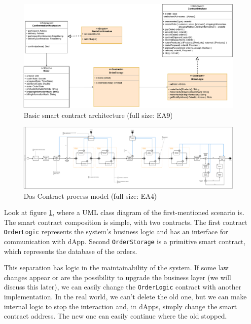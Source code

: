 \documentclass[thesis=M,english]{FITthesis}[2019/12/23]
\begin{document}
\begin{figure}[ht!]
    \centering
    \includegraphics[width=\textwidth]{assets/SmartContractArchitecture-1_1.pdf}
    \caption{Basic smart contract architecture  (full size: EA9)}
    \label{fig:bacisSCarchitecture}
\end{figure}

\begin{figure}[ht!]
    \centering
    \includegraphics[width=\textwidth]{assets/smart-contract-process-diagram-with-delivery.png}
    \caption{Das Contract process model  (full size: EA4)} %
    \label{fig:dasContractProcess}
\end{figure}

Look at figure \ref{fig:bacisSCarchitecture}, where a UML class diagram of the first-mentioned scenario is. The smart contract composition is simple, with two contracts. The first contract \texttt{OrderLogic} represents the system's business logic and has an interface for communication with dApp. Second \texttt{OrderStorage} is a primitive smart contract, which represents the database of the orders. 

This separation has logic in the maintainability of the system. If some law changes appear or are the possibility to upgrade the business layer (we will discuss this later), we can easily change the \texttt{OrderLogic} contract with another implementation. In the real world, we can't delete the old one, but we can make internal logic to stop the interaction and, in dApps, simply change the smart contract address. The new one can easily continue where the old stopped.
\end{document}
